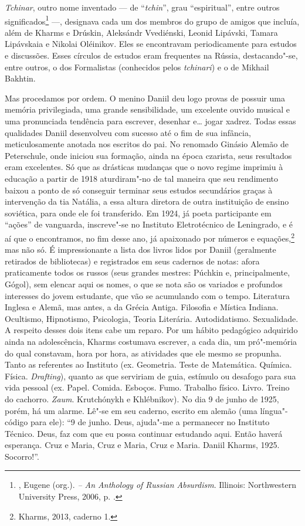 \emph{Tchinar}, outro nome inventado --- de ``\emph{tchin}'', grau
``espiritual'', entre outros significados\footnote{,
Eugene (org.). \emph{ -- An Anthology of Russian
Absurdism}. Illinois: Northwestern University Press, 2006, p.
.} ---, designava cada um dos membros do grupo de
amigos que incluía, além de Kharms e Drúskin, Aleksándr Vvediénski,
Leonid Lipávski, Tamara Lipávskaia e Nikolai Oléinikov. Eles se
encontravam periodicamente para estudos e discussões. Esses círculos
de estudos eram frequentes na Rússia, destacando"-se, entre outros,
o dos Formalistas (conhecidos pelos \emph{tchinari}) e o de Mikhail
Bakhtin.

Mas procedamos por ordem. O menino Daniil deu logo provas de
possuir uma memória privilegiada, uma grande sensibilidade,
um excelente ouvido musical e uma pronunciada tendência para
escrever, desenhar e\ldots{} jogar xadrez. Todas essas qualidades
Daniil desenvolveu com sucesso até o fim de sua infância,
meticulosamente anotada nos escritos do pai. No renomado Ginásio
Alemão de Peterschule, onde iniciou sua formação, ainda na época
czarista, seus resultados eram excelentes. Só que as drásticas
mudanças que o novo regime imprimiu à educação a partir de 1918
aturdiram"-no de tal maneira que seu rendimento baixou a ponto de só
conseguir terminar seus estudos secundários graças à intervenção da
tia Natália, a essa altura diretora de outra instituição de ensino
soviética, para onde ele foi transferido. Em 1924, já poeta
participante em ``ações'' de vanguarda, inscreve"-se no Instituto
Eletrotécnico de Leningrado, e é aí que o encontramos, no fim
desse ano, já apaixonado por números e equações,\footnote{Kharms,
2013, caderno 1.} mas não só. É impressionante a lista dos livros
lidos por Daniil (geralmente retirados de bibliotecas) e registrados
em seus cadernos de notas: afora praticamente todos os russos
(seus grandes mestres: Púchkin e, principalmente, Gógol), sem
elencar aqui os nomes, o que se nota são os variados e profundos
interesses do jovem estudante, que vão se acumulando com o tempo.
Literatura Inglesa e Alemã, mas antes, a da Grécia Antiga.
Filosofia e Mística Indiana. Ocultismo, Hipnotismo, Psicologia,
Teoria Literária. Autodidatismo. Sexualidade. A respeito desses
dois itens cabe um reparo. Por um hábito pedagógico adquirido
ainda na adolescência, Kharms costumava escrever, a cada dia, um
pró"-memória do qual constavam, hora por hora, as atividades que
ele mesmo se propunha. Tanto as referentes ao Instituto (ex.
Geometria. Teste de Matemática. Química. Física. \emph{Drafting}),
quanto as que serviriam de guia, estímulo ou desafogo para sua
vida pessoal (ex. Papel. Comida. Esboços. Fumo. Trabalho físico.
Livro. Treino do cachorro. \emph{Zaum}. Krutchónykh e Khlébnikov).
No dia 9 de junho de 1925, porém, há um alarme. Lê"-se em seu
caderno, escrito em alemão (uma língua"-código para ele): ``9 de
junho. Deus, ajuda"-me a permanecer no Instituto Técnico. Deus,
faz com que eu possa continuar estudando aqui. Então haverá
esperança. Cruz e Maria, Cruz e Maria, Cruz e Maria. Daniil
Kharms, 1925. Socorro!''.

